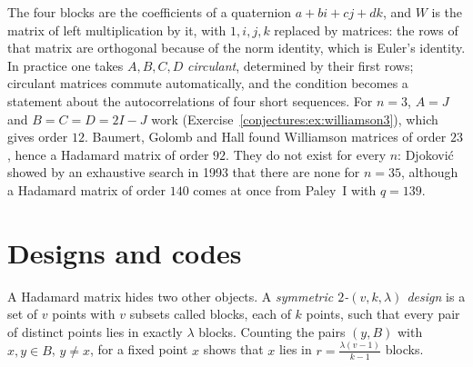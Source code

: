 The four blocks are the coefficients of a quaternion $a+bi+cj+dk$, and $W$ is the matrix of left multiplication by it, with $1,i,j,k$ replaced by
matrices: the rows of that matrix are orthogonal because of the norm identity, which is Euler's identity. In practice one takes $A,B,C,D$
\emph{circulant}, determined by their first rows; circulant matrices commute automatically, and the condition becomes a statement about the
autocorrelations of four short sequences. For $n=3$, $A=J$ and $B=C=D=2I-J$ work (Exercise~\ref{conjectures:ex:williamson3}), which gives order $12$. Baumert,
Golomb and Hall found Williamson matrices of order $23$, hence a Hadamard matrix of order $92$. They do not exist for every $n$: Djokovi\'c showed by an
exhaustive search in 1993 that there are none for $n=35$, although a Hadamard matrix of order $140$ comes at once from Paley~I with $q=139$.

\section{Designs and codes}

A Hadamard matrix hides two other objects. A \emph{symmetric $2$-$(v,k,\lambda)$ design} is a set of $v$ points with $v$ subsets called blocks, each of
$k$ points, such that every pair of distinct points lies in exactly $\lambda$ blocks. Counting the pairs $(y,B)$ with $x,y\in B$, $y\neq x$, for a fixed
point $x$ shows that $x$ lies in $r=\frac{\lambda(v-1)}{k-1}$ blocks.

